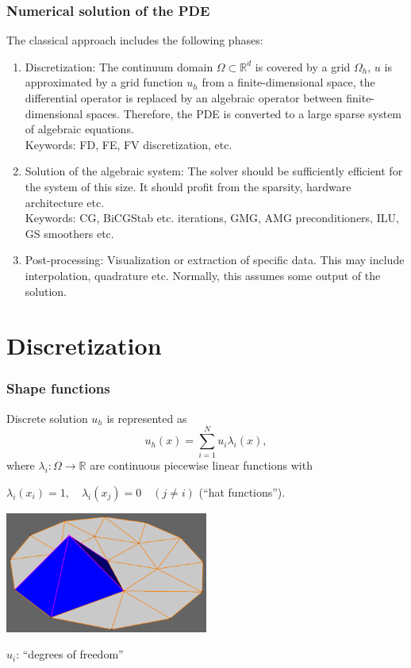\documentclass[xcolor=dvipsnames]{beamer}
\begin{document}
\begin {frame} [t]
\frametitle {Numerical solution of the PDE}
\vspace {-2ex}
The classical approach includes the following phases:
\begin {enumerate}
	\item {\color{red} Discretization}: The continuum domain $\Omega \subset \mathbb{R}^d$
		is covered by a {\color{blue} grid} $\Omega_h$, $u$ is approximated by a
		{\color{blue} grid function} $u_h$ from a finite-dimensional space, the differential
		operator is replaced by an {\color{blue} algebraic} operator between finite-dimensional spaces.
		Therefore, the PDE is converted to a {\color{blue} large sparse system of algebraic equations}. \\
		Keywords: FD, FE, FV discretization, etc.
	\pause
	\item {\color{red} Solution of the algebraic system}: The {\color{blue} solver} should
		be sufficiently efficient for the system of this size. It should profit from the sparsity,
		hardware architecture etc. \\
		Keywords: CG, BiCGStab etc. iterations, GMG, AMG preconditioners,
		ILU, GS smoothers etc.
	\pause
	\item {\color{red} Post-processing}: {\color{blue} Visualization} or extraction of specific data. This may
		include interpolation, quadrature etc. Normally, this assumes some output
		of the solution.
\end {enumerate}
\end {frame}

\section {Discretization}

\begin {frame} [t]
\frametitle {Shape functions}
Discrete solution $u_h$ is represented as
$$
 u_h (x) = \sum_{i = 1}^{N} u_i \lambda_i (x),
$$
where $\lambda_i: \Omega \to \mathbb{R}$ are continuous piecewise linear functions with
\centerline {$\lambda_i (x_i) = 1, \quad \lambda_i (x_j) = 0 \quad (j \ne i)$ (``hat functions'').}

\vspace {2ex}
\centerline {\includegraphics [width = 0.5\textwidth] {Circle-phi.png}}

\centerline {$u_i$: ``degrees of freedom''}
\end {frame}
\end{document}
